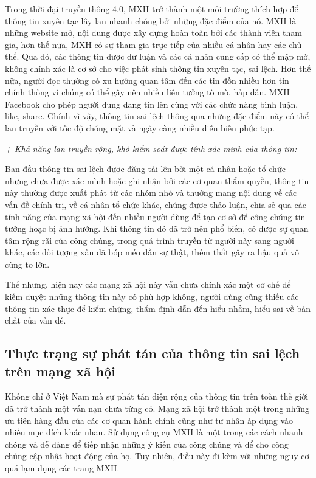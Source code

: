 		Trong thời đại truyền thông 4.0, MXH trở thành một môi trường thích hợp để thông tin xuyên tạc lây lan nhanh chóng bởi những đặc điểm của nó. MXH là những website mở, nội dung được xây dựng hoàn toàn bởi các thành viên tham gia, hơn thế nữa, MXH có sự tham gia trực tiếp của nhiều cá nhân hay các chủ thể. Qua đó, các thông tin được dư luận và các cá nhân cung cấp có thể mập mờ, không chính xác là cơ sở cho việc phát sinh thông tin xuyên tạc, sai lệch. Hơn thế nữa, người đọc thường có xu hướng quan tâm đến các tin đồn nhiều hơn tin chính thống vì chúng có thể gây nên nhiều liên tưởng tò mò, hấp dẫn. MXH Facebook cho phép người dung đăng tin lên cùng với các chức năng bình luận, like, share. Chính vì vậy, thông tin sai lệch thông qua những đặc điểm này có thể lan truyền với tốc độ chóng mặt và ngày càng nhiều diễn biến phức tạp.
		
		{\itshape + Khả năng lan truyền rộng, khó kiểm soát được tính xác minh của thông tin: }
		
		Ban đầu thông tin sai lệch được đăng tải lên bởi một cá nhân hoặc tổ chức nhưng chưa được xác mình hoặc ghi nhận bởi các cơ quan thẩm quyền, thông tin này thường được xuất phát từ các nhóm nhỏ và thường mang nội dung về các vấn đề chính trị, về cá nhân tổ chức khác, chúng được thảo luận, chia sẻ qua các tính năng của mạng xã hội đến nhiều người dùng để tạo cơ sở để công chúng tin tưởng hoặc bị ảnh hưởng. Khi thông tin đó đã trở nên phổ biến, có được sự quan tâm rộng rãi của công chúng, trong quá trình truyền từ người này sang người khác, các đối tượng xấu đã bóp méo dần sự thật, thêm thắt gây ra hậu quả vô cùng to lớn.
		
		Thế nhưng, hiện nay các mạng xã hội này vẫn chưa chính xác một cơ chế để kiểm duyệt những thông tin này có phù hợp không, người dùng cũng thiếu các thông tin xác thực để kiểm chứng, thẩm định dẫn đến hiểu nhầm, hiểu sai về bản chất của vấn đề.
	\subsection{Thực trạng sự phát tán của thông tin sai lệch trên mạng xã hội }
	Không chỉ ở Việt Nam mà sự phát tán diện rộng của thông tin trên toàn thế giới đã trở thành một vấn nạn chưa từng có. Mạng xã hội trở thành một trong những ưu tiên hàng đầu của các cơ quan hành chính cũng như tư nhân áp dụng vào nhiều mục đích khác nhau. Sử dụng công cụ MXH là một trong các cách nhanh chóng và dễ dàng để tiếp nhận những ý kiến của công chúng và để cho công chúng cập nhật hoạt động của họ. Tuy nhiên, điều này đi kèm với những nguy cơ quá lạm dụng các trang MXH.
	
